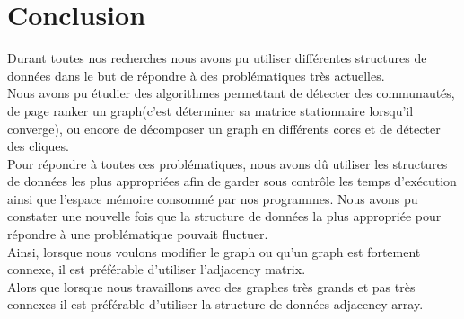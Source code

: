 \documentclass[a4paper,10pt]{report}
\begin{document}
\chapter{Conclusion}
Durant toutes nos recherches nous avons pu utiliser différentes structures de données dans le but de répondre à des problématiques très actuelles. 
\\
Nous avons pu étudier des algorithmes permettant de détecter des communautés, de page ranker un graph(c'est déterminer sa matrice stationnaire lorsqu'il converge), ou encore de décomposer un graph en différents cores et de détecter des cliques.
\\
\newline
Pour répondre à toutes ces problématiques, nous avons dû utiliser les structures de données les plus appropriées afin de garder sous contrôle les temps d'exécution ainsi que l'espace mémoire consommé par nos programmes.
\newline
Nous avons pu constater une nouvelle fois que la structure de données la plus appropriée pour répondre à une problématique pouvait fluctuer.
\\
Ainsi, lorsque nous voulons modifier le graph ou qu'un graph est fortement connexe, il est préférable d'utiliser l'adjacency matrix.\\
Alors que lorsque nous travaillons avec des graphes très grands et pas très connexes il est préférable d'utiliser la structure de données adjacency array.
\end{document}
